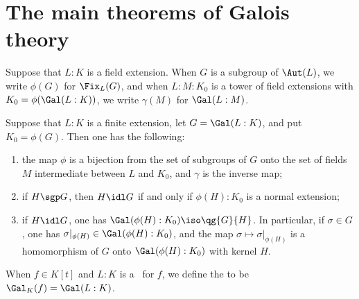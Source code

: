\documentclass{article}
\begin{document}
\section{The main theorems of Galois theory}
  \begin{tdefinition}
    Suppose that \( L:K \) is a field extension.
    When \( G \) is a subgroup of \( \Aut(L) \), we write \( \phi(G) \) for \( \Fix_L(G) \), and when \( L:M:K_0 \) is a tower of field extensions with \( K_0=\phi(\Gal(L:K)) \), we write \( \gamma(M) \) for \( \Gal(L:M) \).
  \end{tdefinition}

  \begin{ttheorem}
    Suppose that \( L:K \) is a finite extension, let \( G=\Gal(L:K) \), and put \( K_0=\phi(G) \).
    Then one has the following: \begin{enumerate}[label=(\alph*)]
      \item the map \( \phi \) is a bijection from the set of subgroups of \( G \) onto the set of fields \( M \) intermediate between \( L \) and \( K_0 \), and \( \gamma \) is the inverse map;
      \item if \( H \sgp G \), then \( H\idl G \) if and only if \( \phi(H):K_0 \) is a normal extension;
      \item if \( H\idl G \), one has \( \Gal(\phi(H):K_0) \iso \qg{G}{H} \).
        In particular, if \( \sigma\in G \), one has \( \sigma|_{\phi(H)} \in \Gal(\phi(H):K_0) \), and the map \( \sigma\mapsto\sigma|_{\phi(H)} \) is a homomorphism of \( G \) onto \( \Gal(\phi(H):K_0) \) with kernel \( H \).
    \end{enumerate}
  \end{ttheorem}

  \begin{tdefinition}
    When \( f\in K[t] \) and \( L:K \) is a \sfe~for \( f \), we define the  to be \( \Gal_K(f) = \Gal(L:K) \).
  \end{tdefinition}

\end{document}
